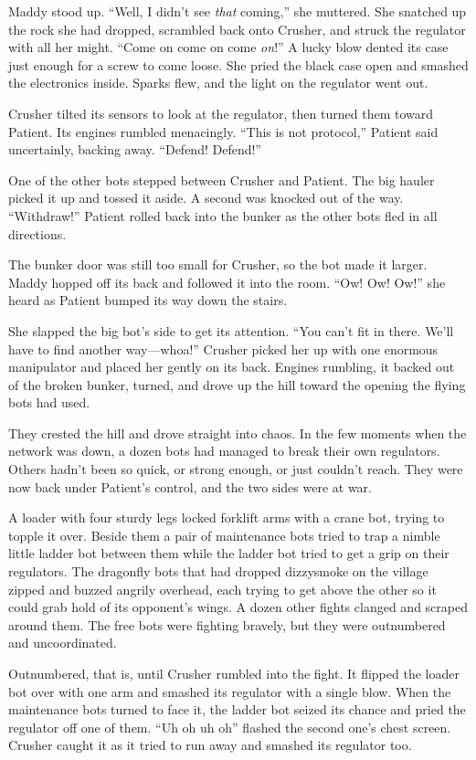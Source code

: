 \documentclass[10pt]{article}
\begin{document}
Maddy stood up. ``Well, I didn't see \emph{that} coming,'' she muttered.
She snatched up the rock she had dropped, scrambled back onto Crusher,
and struck the regulator with all her might. ``Come on come on come
\emph{on}!'' A lucky blow dented its case just enough for a screw to
come loose. She pried the black case open and smashed the electronics
inside. Sparks flew, and the light on the regulator went out.

Crusher tilted its sensors to look at the regulator, then turned them
toward Patient. Its engines rumbled menacingly. ``This is not
protocol,'' Patient said uncertainly, backing away. ``Defend! Defend!''

One of the other bots stepped between Crusher and Patient. The big
hauler picked it up and tossed it aside. A second was knocked out of the
way. ``Withdraw!'' Patient rolled back into the bunker as the other bots
fled in all directions.

The bunker door was still too small for Crusher, so the bot made it
larger. Maddy hopped off its back and followed it into the room. ``Ow!
Ow! Ow!'' she heard as Patient bumped its way down the stairs.

She slapped the big bot's side to get its attention. ``You can't fit in
there. We'll have to find another way---whoa!'' Crusher picked her up
with one enormous manipulator and placed her gently on its back. Engines
rumbling, it backed out of the broken bunker, turned, and drove up the
hill toward the opening the flying bots had used.

They crested the hill and drove straight into chaos. In the few moments
when the network was down, a dozen bots had managed to break their own
regulators. Others hadn't been so quick, or strong enough, or just
couldn't reach. They were now back under Patient's control, and the two
sides were at war.

A loader with four sturdy legs locked forklift arms with a crane bot,
trying to topple it over. Beside them a pair of maintenance bots tried
to trap a nimble little ladder bot between them while the ladder bot
tried to get a grip on their regulators. The dragonfly bots that had
dropped dizzysmoke on the village zipped and buzzed angrily overhead,
each trying to get above the other so it could grab hold of its
opponent's wings. A dozen other fights clanged and scraped around them.
The free bots were fighting bravely, but they were outnumbered and
uncoordinated.

Outnumbered, that is, until Crusher rumbled into the fight. It flipped
the loader bot over with one arm and smashed its regulator with a single
blow. When the maintenance bots turned to face it, the ladder bot seized
its chance and pried the regulator off one of them. ``Uh oh uh oh''
flashed the second one's chest screen. Crusher caught it as it tried to
run away and smashed its regulator too.
\end{document}
